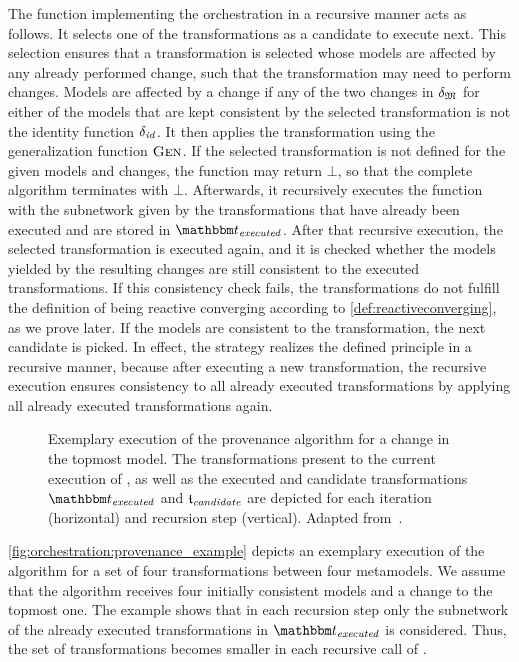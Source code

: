 The function  implementing the orchestration in a recursive manner acts as follows.
It selects one of the transformations as a candidate to execute next.
This selection ensures that a transformation is selected whose models are affected by any already performed change, such that the transformation may need to perform changes.
Models are affected by a change if any of the two changes in $\change{\metamodeltuple{M}}$ for either of the models that are kept consistent by the selected transformation is not the identity function $\delta_{\mathit{id}}$.
It then applies the transformation using the generalization function $\textsc{Gen}_{}$.
If the selected transformation is not defined for the given models and changes, the function may return $\bot$, so that the complete algorithm terminates with $\bot$.
Afterwards, it recursively executes the function  with the subnetwork given by the transformations that have already been executed and are stored in $\provalgexecuted$.
After that recursive execution, the selected transformation is executed again, and it is checked whether the models yielded by the resulting changes are still consistent to the executed transformations.
If this consistency check fails, the transformations do not fulfill the definition of being reactive converging according to \autoref{def:reactiveconverging}, as we prove later.
If the models are consistent to the transformation, the next candidate is picked.
In effect, the strategy realizes the defined principle in a recursive manner, because after executing a new transformation, the recursive execution ensures consistency to all already executed transformations by applying all already executed transformations again.

\begin{figure}
    \centering
    
    \caption[Exemplary execution of the provenance algorithm]{%
    Exemplary execution of the provenance algorithm for a change in the topmost model. 
    The transformations present to the current execution of , as well as the executed and candidate transformations $\provalgexecuted$ and $\provalgcandidate$ are depicted for each iteration (horizontal) and recursion step (vertical). Adapted from~.
}
    \label{fig:orchestration:provenance_example}
\end{figure}

\autoref{fig:orchestration:provenance_example} depicts an exemplary execution of the  algorithm for a set of four transformations between four metamodels.
We assume that the algorithm receives four initially consistent models and a change to the topmost one.
The example shows that in each recursion step only the subnetwork of the already executed transformations in $\provalgexecuted$ is considered.
Thus, the set of transformations becomes smaller in each recursive call of .


